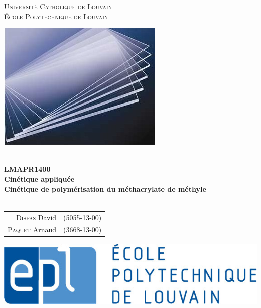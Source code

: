 \documentclass[a4paper,oneside,12pt]{article}
\begin{document}
\begin{titlepage} 
	\centering
	{\LARGE \textsc{Université Catholique de Louvain}}\\
	{\large \textsc{École Polytechnique de Louvain}}\\
	
	\vspace{1.3cm}
	
	\begin{center}
	\includegraphics[scale=0.65]{Images/plexi.jpg}
	\end{center}
	
	\vspace{1.1cm}
	\hrulefill
	\\
	\vspace{0.9cm}
	{\huge \textbf{LMAPR1400}}\\
	\vspace{0.25cm}
	{\huge \textbf{Cinétique appliquée}} \\ 
	\vspace{0.7cm}
	{\huge \textbf{Cinétique de polymérisation du méthacrylate de méthyle}} \\
	\vspace{0.5cm}
	\hrulefill
	\\
	\vspace{0.9cm}
	
	\begin{center}
		\begin{tabular}{rl}
			
			\textsc{Dispas} David & (5055-13-00)\\
			\textsc{Paquet} Arnaud & (3668-13-00)\\
			
		\end{tabular}
	\end{center}
	
	\vfill
	
	\begin{center}
		\includegraphics[scale=0.3]{Images/epl-logo.jpg}
	\end{center}
	

\end{titlepage}
\end{document}
